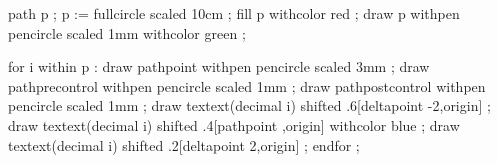 \continuewhenlmtxmode

\startMPpage

    path p ; p := fullcircle scaled 10cm ;
    fill p withcolor red ;
    draw p withpen pencircle scaled 1mm withcolor green ;

    for i within p :
        draw pathpoint       withpen pencircle scaled 3mm ;
        draw pathprecontrol  withpen pencircle scaled 1mm ;
        draw pathpostcontrol withpen pencircle scaled 1mm ;
        draw textext(decimal i) shifted  .6[deltapoint -2,origin] ;
        draw textext(decimal i) shifted  .4[pathpoint    ,origin] withcolor blue ;
        draw textext(decimal i) shifted  .2[deltapoint  2,origin] ;
    endfor ;

\stopMPpage
